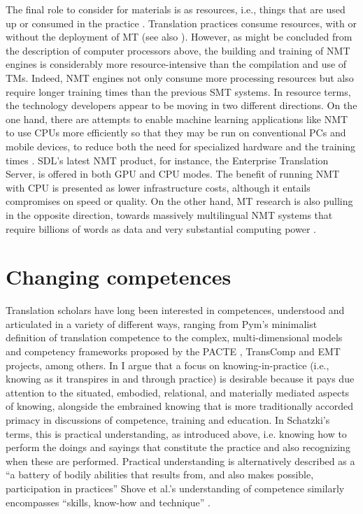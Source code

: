 \documentclass[output=paper,colorlinks,citecolor=brown]{langsci/langscibook}
\begin{document}
The final role to consider for materials is as resources, i.e., things that are used up or consumed in the practice \citep{shove_matters_2017}. Translation practices consume resources, with or without the deployment of MT (see also \citealt{cronin_eco-translation_2017}). However, as might be concluded from the description of computer processors above, the building and training of NMT engines is considerably more resource-intensive than the compilation and use of TMs. Indeed, NMT engines not only consume more processing resources but also require longer training times than the previous SMT systems. In resource terms, the technology developers appear to be moving in two different directions. On the one hand, there are attempts to enable machine learning applications like NMT to use CPUs more efficiently so that they may be run on conventional PCs and mobile devices, to reduce both the need for specialized hardware and the training times \citep{devlin_sharp_2017}. SDL’s latest NMT product, for instance, the Enterprise Translation Server, is offered in both GPU and CPU modes. The benefit of running NMT with CPU is presented as lower infrastructure costs, although it entails compromises on speed or quality. On the other hand, MT research is also pulling in the opposite direction, towards massively multilingual NMT systems that require billions of words as data and very substantial computing power \citep{aharoni_massively_2019}.

\section{Changing competences}

Translation scholars have long been interested in competences, understood and articulated in a variety of different ways, ranging from Pym’s \citeyearpar{pym_redefining_2003} minimalist definition of translation competence to the complex, multi-dimensional models and competency frameworks proposed by the PACTE \citep{hurtado_albir_researching_2017}, TransComp \citep{gopferich_translation_2013} and EMT \citep{emt_board_european_2017} projects, among others. In \citet{olohan_knowing_2017} I argue that a focus on knowing-in-practice (i.e., knowing as it transpires in and through practice) is desirable because it pays due attention to the situated, embodied, relational, and materially mediated aspects of knowing, alongside the embrained knowing that is more traditionally accorded primacy in discussions of competence, training and education. In Schatzki’s terms, this is practical understanding, as introduced above, i.e. knowing how to perform the doings and sayings that constitute the practice and also recognizing when these are performed. Practical understanding is alternatively described as a \enquote{a battery of bodily abilities that results from, and also makes possible, participation in practices} \citep[9]{schatzki_introduction:_2001} Shove et al.’s understanding of competence similarly encompasses \enquote{skills, know-how and technique} \citeyearpar[15]{shove_dynamics_2012}.
\end{document}
